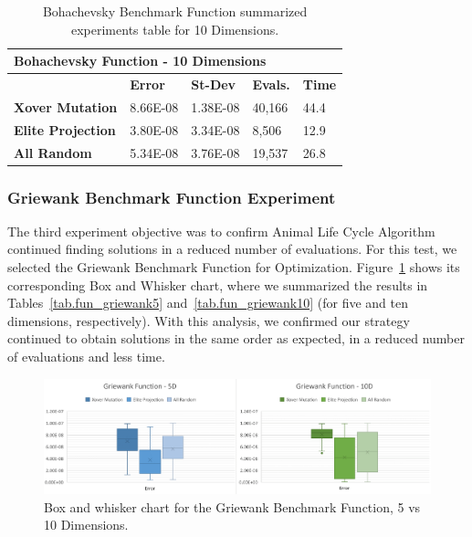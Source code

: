 \documentclass[graybox]{svmult}
\begin{document}
            \begin{table}[]
                \scriptsize
                \centering
                \caption{Bohachevsky Benchmark Function summarized experiments table for 10 Dimensions.}\label{tab.fun_bohachevsky10}
                \begin{tabular}{@{}lllll@{}}
                \toprule
                \multicolumn{5}{l}{\textbf{Bohachevsky Function - 10 Dimensions}} \\ \midrule
                & \textbf{Error} & \textbf{St-Dev} & \textbf{Evals.} & \textbf{Time} \\
                \textbf{Xover Mutation} & 8.66E-08 & 1.38E-08 & 40,166 & 44.4 \\
                \textbf{Elite Projection} & 3.80E-08 & 3.34E-08 & 8,506 & 12.9 \\
                \textbf{All Random} & 5.34E-08 & 3.76E-08 & 19,537 & 26.8 \\ \bottomrule
                \end{tabular}
                \end{table}
            
            \FloatBarrier


        \subsubsection{Griewank Benchmark Function Experiment}

            The third experiment objective was to confirm Animal Life Cycle
            Algorithm continued finding solutions in a reduced number of
            evaluations. For this test, we selected the Griewank Benchmark
            Function for Optimization. Figure~\ref{fig.fun_griewank} shows its
            corresponding Box and Whisker chart, where we summarized the
            results in Tables~\ref{tab.fun_griewank5} and~\ref{tab.fun_griewank10} 
            (for five and ten dimensions, respectively). With this analysis, 
            we confirmed our strategy continued to obtain solutions in the same 
            order as expected, in a reduced number of evaluations and less time.

            \begin{figure}
                \includegraphics[width=0.99\linewidth, frame]{img/fig_fun_griewank.pdf}
                \caption{Box and whisker chart for the Griewank Benchmark Function, 5 vs 10 Dimensions.} \label{fig.fun_griewank}
                \end{figure}
\end{document}
